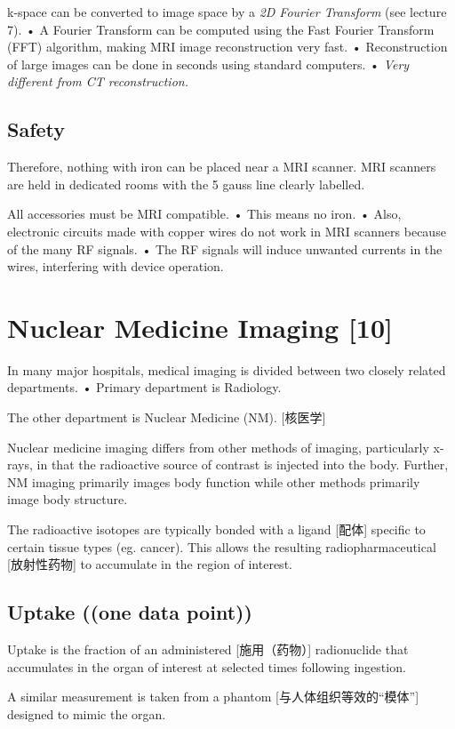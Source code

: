 \documentclass[UTF8,a4paper,11pt]{book}
\theoremstyle{mystyle}{
  \newtheorem{example}{Example}
}
\begin{document}
 k-space can be converted to image space by a
\emph{2D Fourier Transform} (see lecture 7).
• A Fourier Transform can be computed using
the Fast Fourier Transform (FFT) algorithm,
making MRI image reconstruction very fast.
• Reconstruction of large images can be done in
seconds using standard computers.
• \emph{Very different from CT reconstruction.}


\section{Safety}
Therefore, nothing with iron can be placed
near a MRI scanner.
 MRI scanners are held in dedicated rooms
with the 5 gauss line clearly labelled.

 All accessories must be MRI compatible.
• This means no iron.
• Also, electronic circuits made with copper
wires do not work in MRI scanners because of
the many RF signals.
• The RF signals will induce unwanted currents
in the wires, interfering with device operation.


\chapter{Nuclear Medicine Imaging [10]}
 In many major hospitals, medical imaging is
divided between two closely related
departments.
• Primary department is Radiology.

 The other department is Nuclear Medicine
(NM). [核医学]

Nuclear medicine imaging differs from other
methods of imaging, particularly x-rays, in that
the radioactive source of contrast is injected
into the body.
 Further, NM imaging primarily images body
function while other methods primarily image
body structure.

The radioactive isotopes are typically bonded
with a ligand [配体] specific to certain tissue types
(eg. cancer). This allows the resulting
radiopharmaceutical [放射性药物] to accumulate in the
region of interest.

\section{Uptake ((one data point))}

Uptake is the fraction of an
administered [施用（药物）] radionuclide
that accumulates in the
organ of interest at
selected times following
ingestion.

A similar measurement is taken from a
phantom [与人体组织等效的“模体”] designed to mimic the organ.
\end{document}
